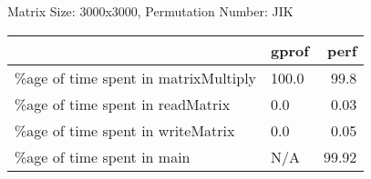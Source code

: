 \documentclass{article}
\begin{document}
    Matrix Size: 3000x3000, Permutation Number: JIK \\
    \begin{tabular}{llr}
\hline
                                      & gprof   &   perf \\
\hline
 \%age of time spent in matrixMultiply & 100.0   &  99.8  \\
 \%age of time spent in readMatrix     & 0.0     &   0.03 \\
 \%age of time spent in writeMatrix    & 0.0     &   0.05 \\
 \%age of time spent in main           & N/A     &  99.92 \\
\hline
\end{tabular}
    
\end{document}
